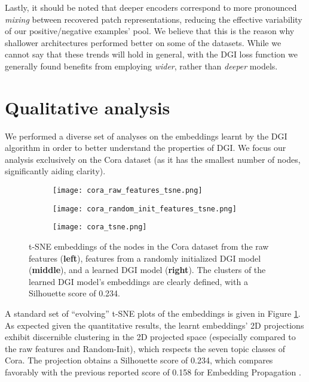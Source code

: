\documentclass{article} \usepackage{iclr2019_conference,times}
\begin{document}
Lastly, it should be noted that deeper encoders correspond to more pronounced \emph{mixing} between recovered patch representations, reducing the effective variability of our positive/negative examples' pool. We believe that this is the reason why shallower architectures performed better on some of the datasets. While we cannot say that these trends will hold in general, with the DGI loss function we generally found benefits from employing \emph{wider}, rather than \emph{deeper} models.

\section{Qualitative analysis}
We performed a diverse set of analyses on the embeddings learnt by the DGI algorithm in order to better understand the properties of DGI. We focus our analysis exclusively on the Cora dataset (as it has the smallest number of nodes, significantly aiding clarity).

\begin{figure}
\centering
\begin{subfigure}{0.33\textwidth}
  \centering
  \texttt{[image: cora\_raw\_features\_tsne.png]}
\end{subfigure}\begin{subfigure}{0.33\textwidth}
  \centering
  \texttt{[image: cora\_random\_init\_features\_tsne.png]}
\end{subfigure}\begin{subfigure}{0.33\textwidth}
  \centering
  \texttt{[image: cora\_tsne.png]}
\end{subfigure}
\caption{t-SNE embeddings of the nodes in the Cora dataset from the raw features ({\bf left}), features from a randomly initialized DGI model ({\bf middle}), and a learned DGI model ({\bf right}). The clusters of the learned DGI model's embeddings are clearly defined, with a Silhouette score of 0.234.}
\label{fig:cora_raw_and_random_features}
\end{figure}

A standard set of ``evolving'' t-SNE plots \citep{maaten2008visualizing} of the embeddings is given in Figure \ref{fig:cora_raw_and_random_features}. As expected given the quantitative results, the learnt embeddings' 2D projections exhibit discernible clustering in the 2D projected space (especially compared to the raw features and Random-Init), which respects the seven topic classes of Cora. The projection obtains a Silhouette score \citep{rousseeuw1987silhouettes} of 0.234, which compares favorably with the previous reported score of 0.158 for Embedding Propagation \citep{duran2017learning}.
\end{document}
